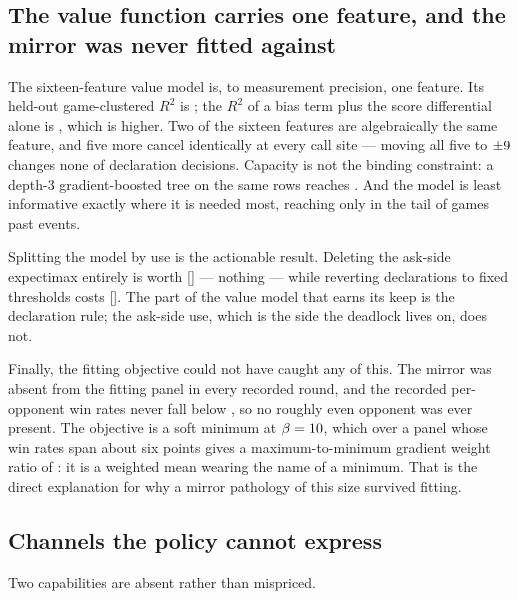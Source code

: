\subsection{The value function carries one feature, and the mirror was never fitted against}
\label{sec:diag-value}

The sixteen-feature value model is, to measurement precision, one feature. Its
held-out game-clustered $R^2$ is \numValueRSq{}; the $R^2$ of a bias term plus
the score differential alone is \numValueRSqScore{}, which is higher. Two of the
sixteen features are algebraically the same feature, and five more cancel
identically at every call site --- moving all five to $\pm9$ changes none of
\numDeadFeatureDecisions{} declaration decisions. Capacity is not the binding
constraint: a depth-3 gradient-boosted tree on the same rows reaches
\numValueRSqTree{}. And the model is least informative exactly where it is needed
most, reaching only \numValueRSqTail{} in the tail of games past \numTailEvents{}
events.

Splitting the model by use is the actionable result. Deleting the ask-side
expectimax entirely is worth \numAskSideValue{} [\numAskSideCI] --- nothing ---
while reverting declarations to fixed thresholds costs \numDeclSideValue{}
[\numDeclSideCI]. The part of the value model that earns its keep is the
declaration rule; the ask-side use, which is the side the deadlock lives on,
does not.

Finally, the fitting objective could not have caught any of this. The mirror was
absent from the fitting panel in every recorded round, and the recorded
per-opponent win rates never fall below \numPanelFloor{}, so no roughly even opponent was
ever present. The objective is a soft minimum at $\beta = 10$, which
over a panel whose win rates span about six points gives a maximum-to-minimum
gradient weight ratio of \numSoftMinRatio{}: it is a weighted mean wearing the
name of a minimum. That is the direct explanation for why a mirror pathology of
this size survived fitting.

\subsection{Channels the policy cannot express}
\label{sec:diag-channels}

Two capabilities are absent rather than mispriced.

